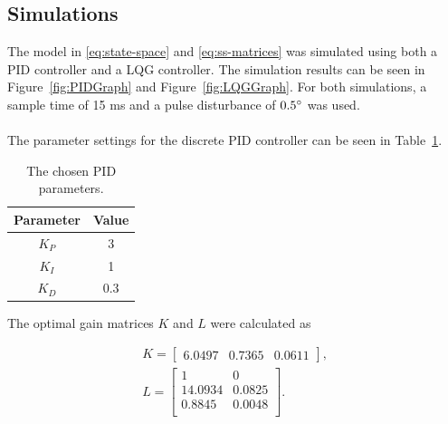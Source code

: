 \subsection{Simulations}
The model in \eqref{eq:state-space} and \eqref{eq:ss-matrices} was simulated using both a PID controller and a LQG controller. The simulation results can be seen in Figure~\ref{fig:PIDGraph} and Figure~\ref{fig:LQGGraph}. For both simulations, a sample time of 15 ms and a pulse disturbance of $0.5\degree$ was used.
\\\\
The parameter settings for the discrete PID controller can be seen in Table~\ref{table:PIDParameters}.

\begin{table}[H]
    \centering
    \begin{tabular}{cc}\toprule
     Parameter  & Value \\\midrule
     $K_{P}$      & 3\\
     $K_{I}$      & 1\\
     $K_{D}$      & 0.3\\\bottomrule
    \end{tabular}
    \caption{The chosen PID parameters.}
    \label{table:PIDParameters}
\end{table}

\noindent
The optimal gain matrices $K$ and $L$ were calculated as

\begin{equation}
    \begin{gathered}
        K =
        \begin{bmatrix}
            6.0497 & 0.7365 & 0.0611
        \end{bmatrix}
        ,\\
        L = 
        \begin{bmatrix}
            1       & 0\\
            14.0934 & 0.0825\\
            0.8845  & 0.0048\\
        \end{bmatrix}
        .
    \end{gathered}
\end{equation}

